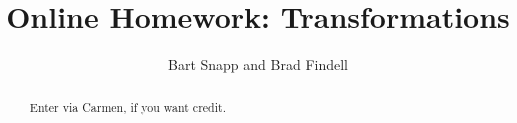 \documentclass[handout,space,nooutcomes]{xourse}
\title{Online Homework: Transformations}
\author{Bart Snapp and Brad Findell}
\begin{document}
\begin{abstract}
Enter via Carmen, if you want credit.  
\end{abstract}
\maketitle

{}
\end{document}
